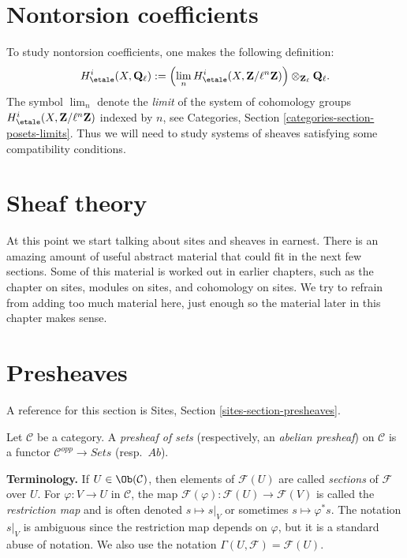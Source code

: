 \section{Nontorsion coefficients}
\label{section-nontorsion}

\noindent
To study nontorsion coefficients, one makes the following definition:
$$
H_\etale^i (X, \mathbf{Q}_\ell) :=
\left( \lim_n H_\etale^i(X, \mathbf{Z}/\ell^n\mathbf{Z}) \right)
\otimes_{\mathbf{Z}_\ell} \mathbf{Q}_\ell.
$$
The symbol $\lim_n$ denote the {\it limit} of the system of
cohomology groups $H_\etale^i(X, \mathbf{Z}/\ell^n\mathbf{Z})$ indexed
by $n$, see
Categories, Section \ref{categories-section-posets-limits}.
Thus we will need to study systems of sheaves satisfying some compatibility
conditions.




\section{Sheaf theory}
\label{section-sheaf-theory}

\noindent
At this point we start talking about sites and sheaves in earnest.
There is an amazing amount of useful abstract material that could fit
in the next few sections. Some of this material is worked out in earlier
chapters, such as the chapter on sites, modules on sites, and cohomology
on sites. We try to refrain from adding too much material here, just
enough so the material later in this chapter makes sense.




\section{Presheaves}
\label{section-presheaves}

\noindent
A reference for this section is
Sites, Section \ref{sites-section-presheaves}.

\begin{definition}
\label{definition-presheaf}
Let $\mathcal{C}$ be a category. A {\it presheaf of sets} (respectively, an
{\it abelian presheaf}) on $\mathcal{C}$ is a functor $\mathcal{C}^{opp} \to
\textit{Sets}$ (resp.\ $\textit{Ab}$).
\end{definition}

\noindent
{\bf Terminology.} If $U \in \Ob(\mathcal{C})$, then elements of
$\mathcal{F}(U)$ are called {\it sections} of $\mathcal{F}$ over
$U$. For $\varphi : V \to U$ in $\mathcal{C}$, the
map $\mathcal{F}(\varphi) : \mathcal{F}(U) \to \mathcal{F}(V)$
is called the {\it restriction map} and is often denoted $s \mapsto s|_V$
or sometimes $s \mapsto \varphi^*s$. The notation $s|_V$ is ambiguous
since the restriction map depends on $\varphi$, but it is a standard
abuse of notation. We also use the notation
$\Gamma(U, \mathcal{F}) = \mathcal{F}(U)$.

